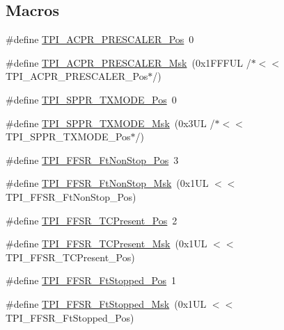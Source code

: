 \subsection*{Macros}
\begin{DoxyCompactItemize}
\item 
\#define \hyperlink{group___c_m_s_i_s___t_p_i_ga5a82d274eb2df8b0c92dd4ed63535928}{T\+P\+I\+\_\+\+A\+C\+P\+R\+\_\+\+P\+R\+E\+S\+C\+A\+L\+E\+R\+\_\+\+Pos}~0
\item 
\#define \hyperlink{group___c_m_s_i_s___t_p_i_ga4fcacd27208419929921aec8457a8c13}{T\+P\+I\+\_\+\+A\+C\+P\+R\+\_\+\+P\+R\+E\+S\+C\+A\+L\+E\+R\+\_\+\+Msk}~(0x1\+F\+F\+F\+U\+L /$\ast$$<$$<$ T\+P\+I\+\_\+\+A\+C\+P\+R\+\_\+\+P\+R\+E\+S\+C\+A\+L\+E\+R\+\_\+\+Pos$\ast$/)
\item 
\#define \hyperlink{group___c_m_s_i_s___t_p_i_ga0f302797b94bb2da24052082ab630858}{T\+P\+I\+\_\+\+S\+P\+P\+R\+\_\+\+T\+X\+M\+O\+D\+E\+\_\+\+Pos}~0
\item 
\#define \hyperlink{group___c_m_s_i_s___t_p_i_gaca085c8a954393d70dbd7240bb02cc1f}{T\+P\+I\+\_\+\+S\+P\+P\+R\+\_\+\+T\+X\+M\+O\+D\+E\+\_\+\+Msk}~(0x3\+U\+L /$\ast$$<$$<$ T\+P\+I\+\_\+\+S\+P\+P\+R\+\_\+\+T\+X\+M\+O\+D\+E\+\_\+\+Pos$\ast$/)
\item 
\#define \hyperlink{group___c_m_s_i_s___t_p_i_ga9537b8a660cc8803f57cbbee320b2fc8}{T\+P\+I\+\_\+\+F\+F\+S\+R\+\_\+\+Ft\+Non\+Stop\+\_\+\+Pos}~3
\item 
\#define \hyperlink{group___c_m_s_i_s___t_p_i_gaaa313f980974a8cfc7dac68c4d805ab1}{T\+P\+I\+\_\+\+F\+F\+S\+R\+\_\+\+Ft\+Non\+Stop\+\_\+\+Msk}~(0x1\+U\+L $<$$<$ T\+P\+I\+\_\+\+F\+F\+S\+R\+\_\+\+Ft\+Non\+Stop\+\_\+\+Pos)
\item 
\#define \hyperlink{group___c_m_s_i_s___t_p_i_gad30fde0c058da2ffb2b0a213be7a1b5c}{T\+P\+I\+\_\+\+F\+F\+S\+R\+\_\+\+T\+C\+Present\+\_\+\+Pos}~2
\item 
\#define \hyperlink{group___c_m_s_i_s___t_p_i_ga0d6bfd263ff2fdec72d6ec9415fb1135}{T\+P\+I\+\_\+\+F\+F\+S\+R\+\_\+\+T\+C\+Present\+\_\+\+Msk}~(0x1\+U\+L $<$$<$ T\+P\+I\+\_\+\+F\+F\+S\+R\+\_\+\+T\+C\+Present\+\_\+\+Pos)
\item 
\#define \hyperlink{group___c_m_s_i_s___t_p_i_gaedf31fd453a878021b542b644e2869d2}{T\+P\+I\+\_\+\+F\+F\+S\+R\+\_\+\+Ft\+Stopped\+\_\+\+Pos}~1
\item 
\#define \hyperlink{group___c_m_s_i_s___t_p_i_ga1ab6c3abe1cf6311ee07e7c479ce5f78}{T\+P\+I\+\_\+\+F\+F\+S\+R\+\_\+\+Ft\+Stopped\+\_\+\+Msk}~(0x1\+U\+L $<$$<$ T\+P\+I\+\_\+\+F\+F\+S\+R\+\_\+\+Ft\+Stopped\+\_\+\+Pos)
\item 
$$
\end{DoxyCompactItemize}
